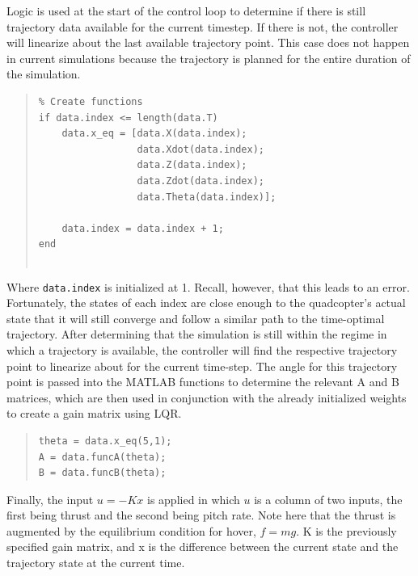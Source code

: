 \documentclass[12pt]{article}
\begin{document}
Logic is used at the start of the control loop to determine if there is still trajectory data available for the current timestep.  If there is not, the controller will linearize about the last available trajectory point.  This case does not happen in current simulations because the trajectory is planned for the entire duration of the simulation.
\begin{quote}
\begin{lstlisting}
% Create functions
if data.index <= length(data.T)
    data.x_eq = [data.X(data.index);
                 data.Xdot(data.index);
                 data.Z(data.index);
                 data.Zdot(data.index);
                 data.Theta(data.index)];
             
    data.index = data.index + 1;
end


\end{lstlisting}
\end{quote}
Where \lstinline!data.index! is initialized at 1. Recall, however, that this leads to an error. Fortunately, the states of each index are close enough to the quadcopter's actual state that it will still converge and follow a similar path to the time-optimal trajectory. 
\newline
\newline
After determining that the simulation is still within the regime in which a trajectory is available, the controller will find the respective trajectory point to linearize about for the current time-step.  The angle for this trajectory point is passed into the MATLAB functions to determine the relevant A and B matrices, which are then used in conjunction with the already initialized weights to create a gain matrix using LQR.
\begin{quote}
\begin{lstlisting}
theta = data.x_eq(5,1);
A = data.funcA(theta);
B = data.funcB(theta);

\end{lstlisting}
\end{quote}

Finally, the input $u = -Kx$ is applied in which $u$ is a column of two inputs, the first being thrust and the second being pitch rate.  Note here that the thrust is augmented by the equilibrium condition for hover, $f = mg$.  K is the previously specified gain matrix, and x is the difference between the current state and the trajectory state at the current time.

\end{document}

